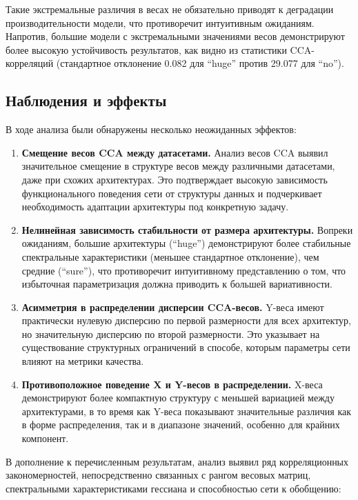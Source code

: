 \documentclass[a4paper,12pt]{article}
\begin{document}
Такие экстремальные различия в весах не обязательно приводят к деградации производительности модели, что
противоречит интуитивным ожиданиям. Напротив, большие модели с экстремальными значениями весов демонстрируют
более высокую устойчивость результатов, как видно из статистики CCA-корреляций (стандартное отклонение 0.082
для ``huge'' против 29.077 для ``no'').

\subsection{Наблюдения и эффекты}

В ходе анализа были обнаружены несколько неожиданных эффектов:

\begin{enumerate}
  \item \textbf{Смещение весов CCA между датасетами.} Анализ весов CCA выявил значительное смещение в
    структуре весов между различными датасетами, даже при схожих архитектурах. Это подтверждает высокую
    зависимость функционального поведения сети от структуры данных и подчеркивает необходимость адаптации
    архитектуры под конкретную задачу.

  \item \textbf{Нелинейная зависимость стабильности от размера архитектуры.} Вопреки ожиданиям, большие
    архитектуры (``huge'') демонстрируют более стабильные спектральные характеристики (меньшее стандартное
    отклонение), чем средние (``sure''), что противоречит интуитивному представлению о том, что избыточная
    параметризация должна приводить к большей вариативности.

  \item \textbf{Асимметрия в распределении дисперсии CCA-весов.} Y-веса имеют практически нулевую дисперсию
    по первой размерности для всех архитектур, но значительную дисперсию по второй размерности. Это указывает
    на существование структурных ограничений в способе, которым параметры сети влияют на метрики качества.

  \item \textbf{Противоположное поведение X и Y-весов в распределении.} X-веса демонстрируют более компактную
    структуру с меньшей вариацией между архитектурами, в то время как Y-веса показывают значительные различия
    как в форме распределения, так и в диапазоне значений, особенно для крайних компонент.
\end{enumerate}

В дополнение к перечисленным результатам, анализ выявил ряд корреляционных закономерностей,
непосредственно связанных с рангом весовых матриц, спектральными характеристиками гессиана и способностью
сети к обобщению:
\end{document}
